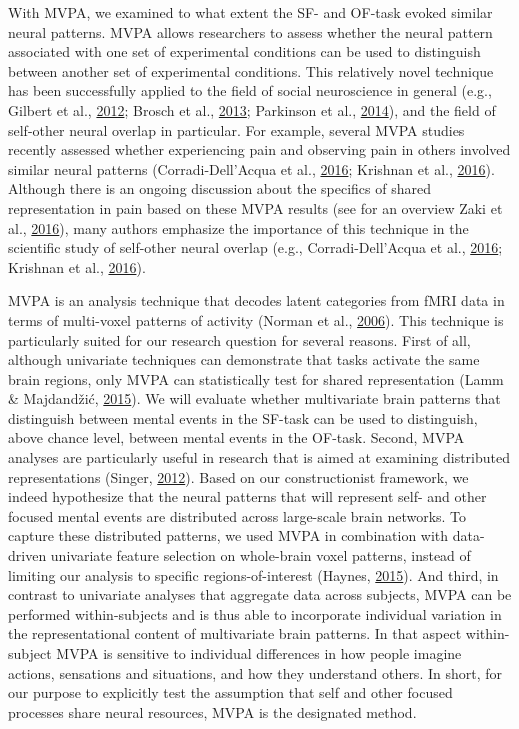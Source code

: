 \documentclass[11pt,american,a4paper,oneside,]{memoir} %
\begin{document}
With MVPA, we examined to what extent the SF- and OF-task evoked similar neural patterns. MVPA allows researchers to assess whether the neural pattern associated with one set of experimental conditions can be used to distinguish between another set of experimental conditions. This relatively novel technique has been successfully applied to the field of social neuroscience in general (e.g., Gilbert et al., \protect\hyperlink{ref-gilbert2012evaluative}{2012}; Brosch et al., \protect\hyperlink{ref-brosch2013implicit}{2013}; Parkinson et al., \protect\hyperlink{ref-parkinson2014common}{2014}), and the field of self-other neural overlap in particular. For example, several MVPA studies recently assessed whether experiencing pain and observing pain in others involved similar neural patterns (Corradi-Dell'Acqua et al., \protect\hyperlink{ref-corradi2016cross}{2016}; Krishnan et al., \protect\hyperlink{ref-krishnan2016somatic}{2016}). Although there is an ongoing discussion about the specifics of shared representation in pain based on these MVPA results (see for an overview Zaki et al., \protect\hyperlink{ref-zaki2016anatomy}{2016}), many authors emphasize the importance of this technique in the scientific study of self-other neural overlap (e.g., Corradi-Dell'Acqua et al., \protect\hyperlink{ref-corradi2016cross}{2016}; Krishnan et al., \protect\hyperlink{ref-krishnan2016somatic}{2016}).

MVPA is an analysis technique that decodes latent categories from fMRI data in terms of multi-voxel patterns of activity (Norman et al., \protect\hyperlink{ref-norman2006beyond}{2006}). This technique is particularly suited for our research question for several reasons. First of all, although univariate techniques can demonstrate that tasks activate the same brain regions, only MVPA can statistically test for shared representation (Lamm \& Majdandžić, \protect\hyperlink{ref-lamm2015role}{2015}). We will evaluate whether multivariate brain patterns that distinguish between mental events in the SF-task can be used to distinguish, above chance level, between mental events in the OF-task. Second, MVPA analyses are particularly useful in research that is aimed at examining distributed representations (Singer, \protect\hyperlink{ref-singer2012past}{2012}). Based on our constructionist framework, we indeed hypothesize that the neural patterns that will represent self- and other focused mental events are distributed across large-scale brain networks. To capture these distributed patterns, we used MVPA in combination with data-driven univariate feature selection on whole-brain voxel patterns, instead of limiting our analysis to specific regions-of-interest (Haynes, \protect\hyperlink{ref-haynes2015primer}{2015}). And third, in contrast to univariate analyses that aggregate data across subjects, MVPA can be performed within-subjects and is thus able to incorporate individual variation in the representational content of multivariate brain patterns. In that aspect within-subject MVPA is sensitive to individual differences in how people imagine actions, sensations and situations, and how they understand others. In short, for our purpose to explicitly test the assumption that self and other focused processes share neural resources, MVPA is the designated method.
\end{document}
